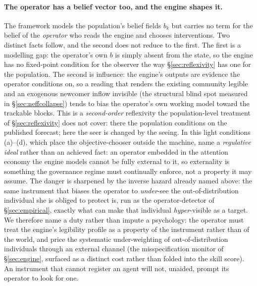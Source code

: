 \documentclass[11pt]{article}
\begin{document}
\paragraph{The operator has a belief vector too, and the engine shapes it.} The framework models the population's belief fields $b_k$ but carries no term for the belief of the \emph{operator} who reads the engine and chooses interventions. Two distinct facts follow, and the second does not reduce to the first. The first is a modelling gap: the operator's own $b$ is simply absent from the state, so the engine has no fixed-point condition for the observer the way \S\ref{sec:reflexivity} has one for the population. The second is influence: the engine's outputs are evidence the operator conditions on, so a reading that renders the existing community legible and an exogenous newcomer inflow invisible (the structural blind spot measured in \S\ref{sec:neffcollapse}) tends to bias the operator's own working model toward the trackable blocks. This is a \emph{second-order} reflexivity the population-level treatment of \S\ref{sec:reflexivity} does not cover: there the population conditions on the published forecast; here the seer is changed by the seeing. In this light conditions (a)--(d), which place the objective-chooser outside the machine, name a \emph{regulative ideal} rather than an achieved fact: an operator embedded in the attention economy the engine models cannot be fully external to it, so externality is something the governance regime must continually enforce, not a property it may assume. The danger is sharpened by the inverse hazard already named above: the same instrument that biases the operator to \emph{under}-see the out-of-distribution individual she is obliged to protect is, run as the operator-detector of \S\ref{sec:empirical}, exactly what can make that individual \emph{hyper}-visible as a target. We therefore name a duty rather than impute a psychology: the operator must treat the engine's legibility profile as a property of the instrument rather than of the world, and price the systematic under-weighting of out-of-distribution individuals through an external channel (the misspecification monitor of \S\ref{sec:engine}, surfaced as a distinct cost rather than folded into the skill score). An instrument that cannot register an agent will not, unaided, prompt its operator to look for one.
\end{document}
